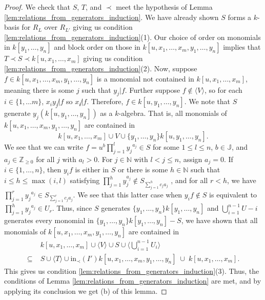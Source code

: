 \documentclass{amsart}
\theoremstyle{plain}
\theoremstyle{definition}
\theoremstyle{remark}
\numberwithin{equation}{section}
\newcommand \halfcan{L}
\newcommand \initial{\text{in}}
\begin{document}
\begin{proof}
We check that $S$, $T$, and $\prec$ meet the hypothesis of Lemma \ref{lem:relations_from_generators_induction}.  We have already shown $S$ forms a $k$-basis for $R_\halfcan$ over $R_{\halfcan'}$ giving us condition \ref{lem:relations_from_generators_induction}(1).  Our choice of order on monomials in $k[y_1, \ldots, y_n]$ and block order on those in $k[u, x_1, \ldots, x_m, y_1, \ldots, y_n]$ implies that $T\prec S\prec k[u, x_1, \ldots, x_m]$ giving us condition \ref{lem:relations_from_generators_induction}(2).  Now, suppose $f\in k[u, x_1, \ldots, x_m, y_1, \ldots, y_n]$ is a monomial not contained in $k[u, x_1, \ldots, x_m]$, meaning there is some $j$ such that $y_j|f$.  Further suppose $f\not\in \langle V \rangle$, so for each $i\in \{1, \ldots m\}$, $x_iy_j\not |f$ so $x_i\not|f$.  Therefore, $f\in k[u, y_1, \ldots, y_n]$.  We note that $S$ generate $y_j (k[u,y_1, \ldots, y_n])$ as a $k$-algebra.  That is, all monomials of $k[u, x_1, \ldots, x_m, y_1, \ldots, y_n]$ are contained in
\[
	k[u, x_1, \ldots, x_m] \cup V \cup \{y_1, \ldots, y_n\} k[u, y_1, \ldots, y_n]. 
\]
We see that we can write $f=u^b \prod_{j=1}^l {y_j}^{a_j}\in S$ for some $1\le l\le n$, $b\in \mathbb{J}$, and $a_j\in \mathbb{Z}_{\ge 0}$ for all $j$ with $a_l> 0$.  For $j\in \mathbb{N}$ with $l < j\le n$, assign $a_j=0$.  If $i\in \{1, \ldots, n\}$, then $y_i f$ is either in $S$ or there is some $h\in \mathbb{N}$ such that $i\le h\le \max(i,l)$ satisfying $\prod_{j=1}^h y_j^{a_j}\not\in S_{\sum_{j=1}^h c_j a_j}$ , and for all $r<h$, we have $\prod_{j=1}^r {y_j}^{a_j}\in S_{\sum_{j=1}^r c_ja_j}$.  We see that this latter case when $y_if\not\in S$ is equivalent to $\prod_{j=1}^h {y_j}^{a_j}\in U_r$.  Thus, since $S$ generates $\{y_1, \ldots, y_n\} k[y_1, \ldots, y_n]$ and $\bigcup_{i=1}^{n-1} U-i$ generates every monomial in $\{y_1, \ldots, y_n\} k[y_1, \ldots, y_n]-S$, we have shown that all monomials of $k[u, x_1, \ldots, x_m, y_1, \ldots, y_n]$ are contained in
\begin{align*}
				& k[u, x_1, \ldots, x_m] \cup \langle V \rangle \cup S \cup \langle \bigcup_{i=1}^{n-1} U_i \rangle \\
	\subseteq \; 	& S \cup \langle T\rangle \cup \initial_\prec(I') k[u, x_1, \ldots, x_m, y_1, \ldots, y_n] \; \cup \; k[u, x_1, \ldots, x_m].
\end{align*}
This gives us condition \ref{lem:relations_from_generators_induction}(3).  Thus, the conditions of Lemma \ref{lem:relations_from_generators_induction} are met, and by applying its conclusion we get (b) of this lemma.  


\end{proof}
\end{document}
